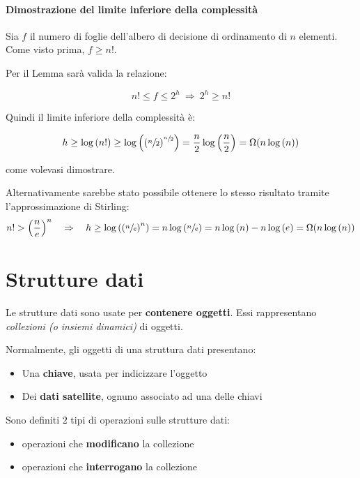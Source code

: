 \documentclass[italian, 10pt]{article}
\begin{document}
\paragraph{Dimostrazione del limite inferiore della complessità}

Sia \(f\) il numero di foglie dell'albero di decisione di ordinamento di \(n\) elementi.
Come visto prima, \(f \geq n!\).

Per il Lemma sarà valida la relazione:

\[ n! \leq f \leq 2^h \ \Rightarrow \ 2^h \geq n! \]

Quindi il limite inferiore della complessità è:

\[ h \geq \log{(n!)} \geq \log\left(\left(\sfrac{n}{2}\right)^{\sfrac{n}{2}}\right) = \dfrac{n}{2} \log\left(\dfrac{n}{2}\right) = \Omega(n \log{(n)} )\]

come volevasi dimostrare.

\bigskip
Alternativamente sarebbe stato possibile ottenere lo stesso risultato tramite l'approssimazione di Stirling:
\[ n! > \left(\dfrac{n}{e}\right)^n \quad \Rightarrow \quad h \geq \log\left(\left(\sfrac{n}{e}\right)^n\right) = n \log\left(\sfrac{n}{e}\right) = n \log{(n)} - n \log{(e)} = \Omega(n \log{(n)})\]

\clearpage

\section{Strutture dati}

Le strutture dati sono usate per \textbf{contenere oggetti}.
Essi rappresentano \textit{collezioni (o insiemi dinamici)} di oggetti.

Normalmente, gli oggetti di una struttura dati presentano:

\begin{itemize}
  \item Una \textbf{chiave}, usata per indicizzare l'oggetto
  \item Dei \textbf{dati satellite}, ognuno associato ad una delle chiavi
\end{itemize}

Sono definiti \(2\) tipi di operazioni sulle strutture dati:

\begin{itemize}
  \item operazioni che \textbf{modificano} la collezione
  \item operazioni che \textbf{interrogano} la collezione
\end{itemize}
\end{document}
